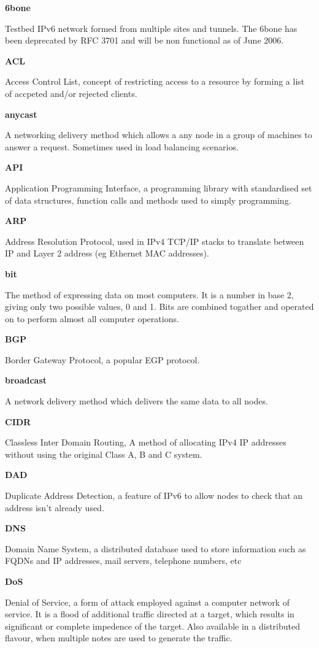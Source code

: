 \textbf{6bone}

Testbed IPv6 network formed from multiple sites and tunnels. The 6bone
has been deprecated by RFC 3701 and will be non functional as of June
2006.

\textbf{ACL}

Access Control List, concept of restricting access to a resource by
forming a list of accpeted and/or rejected clients.

\textbf{anycast}

A networking delivery method which allows a any node in a group of 
machines to answer a request. Sometimes used in load balancing 
scenarios.

\textbf{API}

Application Programming Interface, a programming library with
standardised set of data structures, function calls and methods used to
simply programming.

\textbf{ARP}

Address Resolution Protocol, used in IPv4 TCP/IP stacks to translate 
between IP and Layer 2 address (eg Ethernet MAC addresses).

\textbf{bit}

The method of expressing data on most computers. It is a number in base
2, giving only two possible values, 0 and 1. Bits are combined togather
and operated on to perform almost all computer operations.

\textbf{BGP}

Border Gateway Protocol, a popular EGP protocol.  

\textbf{broadcast}

A network delivery method which delivers the same data to all nodes.

\textbf{CIDR}

Classless Inter Domain Routing, A method of allocating IPv4 IP addresses
without using the original Class A, B and C system.

\textbf{DAD}

Duplicate Address Detection, a feature of IPv6 to allow nodes to check
that an address isn't already used.

\textbf{DNS}

Domain Name System, a distributed database used to store information
such as FQDNs and IP addresses, mail servers, telephone numbers, etc

\textbf{DoS}

Denial of Service, a form of attack employed against a computer network
of service. It is a flood of additional traffic directed at a target,
which results in significant or complete impedence of the target. Also
available in a distributed flavour, when multiple notes are used to
generate the traffic.

